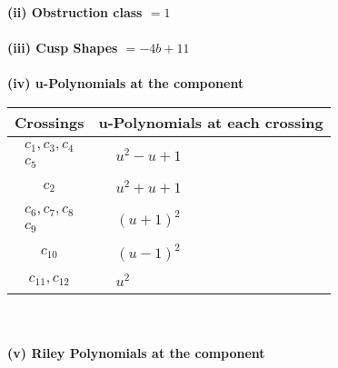 \documentclass[1p]{elsarticle_modified}
\theoremstyle{definition}
\begin{document}
\flushleft \textbf{(ii) Obstruction class $= 1$}\\~\\
\flushleft \textbf{(iii) Cusp Shapes $= -4 b+11$}\\~\\
\newpage\renewcommand{\arraystretch}{1}
\flushleft \textbf{(iv) u-Polynomials at the component}\newline \\
\begin{tabular}{m{50pt}|m{274pt}}
Crossings & \hspace{64pt}u-Polynomials at each crossing \\
\hline $$\begin{aligned}c_{1},c_{3},c_{4}\\c_{5}\end{aligned}$$&$\begin{aligned}
&u^2- u+1
\end{aligned}$\\
\hline $$\begin{aligned}c_{2}\end{aligned}$$&$\begin{aligned}
&u^2+u+1
\end{aligned}$\\
\hline $$\begin{aligned}c_{6},c_{7},c_{8}\\c_{9}\end{aligned}$$&$\begin{aligned}
&(u+1)^2
\end{aligned}$\\
\hline $$\begin{aligned}c_{10}\end{aligned}$$&$\begin{aligned}
&(u-1)^2
\end{aligned}$\\
\hline $$\begin{aligned}c_{11},c_{12}\end{aligned}$$&$\begin{aligned}
&u^2
\end{aligned}$\\
\hline
\end{tabular}\\~\\
\newpage\renewcommand{\arraystretch}{1}
\flushleft \textbf{(v) Riley Polynomials at the component}\newline \\
\end{document}
